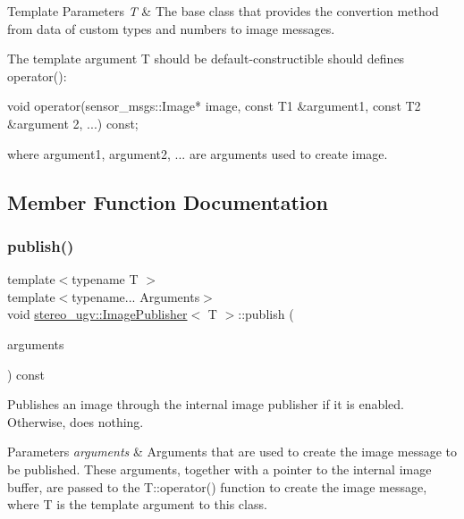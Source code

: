 \begin{DoxyTemplParams}{Template Parameters}
{\em T} & The base class that provides the convertion method from data of custom types and numbers to image messages.\\
\hline
\end{DoxyTemplParams}
The template argument T should be default-\/constructible should defines operator()\+: 
\begin{DoxyCode}
\textcolor{keywordtype}{void} operator(sensor\_msgs::Image* image, \textcolor{keyword}{const} T1 &argument1, \textcolor{keyword}{const} T2 &argument 2, ...) \textcolor{keyword}{const};
\end{DoxyCode}
 where argument1, argument2, ... are arguments used to create image. 

\subsection{Member Function Documentation}
\mbox{\label{classstereo__ugv_1_1ImagePublisher_a699e36f701182496561852715407ed37}} 
\subsubsection{\texorpdfstring{publish()}{publish()}}
{\footnotesize\ttfamily template$<$typename T $>$ \\
template$<$typename... Arguments$>$ \\
void \hyperlink{classstereo__ugv_1_1ImagePublisher}{stereo\+\_\+ugv\+::\+Image\+Publisher}$<$ T $>$\+::publish (\begin{DoxyParamCaption}\item[{Arguments \&\&...}]{arguments }\end{DoxyParamCaption}) const\hspace{0.3cm}{\ttfamily [inline]}}



Publishes an image through the internal image publisher if it is enabled. Otherwise, does nothing. 


\begin{DoxyParams}{Parameters}
{\em arguments} & Arguments that are used to create the image message to be published. These arguments, together with a pointer to the internal image buffer, are passed to the T::operator() function to create the image message, where T is the template argument to this class. \\
\hline
\end{DoxyParams}
\mbox{\label{classstereo__ugv_1_1ImagePublisher_a0ac69be931e19269b89b66da7bbfc00b}} 

